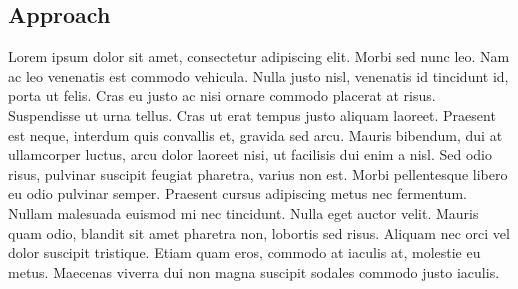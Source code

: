 \subsection{Approach}
\label{sec:hard_cut_approach}

Lorem ipsum dolor sit amet, consectetur adipiscing elit. Morbi sed nunc leo. Nam ac leo venenatis est commodo vehicula. Nulla justo nisl, venenatis id tincidunt id, porta ut felis. Cras eu justo ac nisi ornare commodo placerat at risus. Suspendisse ut urna tellus. Cras ut erat tempus justo aliquam laoreet. Praesent est neque, interdum quis convallis et, gravida sed arcu. Mauris bibendum, dui at ullamcorper luctus, arcu dolor laoreet nisi, ut facilisis dui enim a nisl. Sed odio risus, pulvinar suscipit feugiat pharetra, varius non est. Morbi pellentesque libero eu odio pulvinar semper. Praesent cursus adipiscing metus nec fermentum. Nullam malesuada euismod mi nec tincidunt. Nulla eget auctor velit. Mauris quam odio, blandit sit amet pharetra non, lobortis sed risus. Aliquam nec orci vel dolor suscipit tristique. Etiam quam eros, commodo at iaculis at, molestie eu metus. Maecenas viverra dui non magna suscipit sodales commodo justo iaculis.
